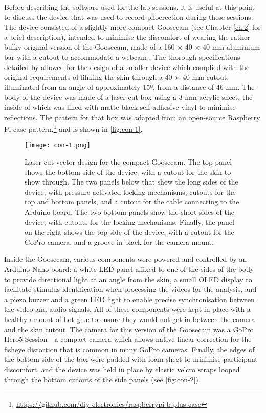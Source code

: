 Before describing the software used for the lab sessions, it is useful at this point to discuss the device that was used to record piloerection during these sessions. The device consisted of a slightly more compact Goosecam (see Chapter \ref{ch:2} for a brief description), intended to minimise the discomfort of wearing the rather bulky original version of the Goosecam, made of a 160 $\times$ 40 $\times$ 40 mm aluminium bar with a cutout to accommodate a webcam \parencite{benedek2010}. The thorough specifications detailed by \textcite{benedek2010} allowed for the design of a smaller device which complied with the original requirements of filming the skin through a 40 $\times$ 40 mm cutout, illuminated from an angle of approximately 15º, from a distance of 46 mm. The body of the device was made of a laser-cut box using a 3 mm acrylic sheet, the inside of which was lined with matte black self-adhesive vinyl to minimise reflections. The pattern for that box was adapted from an open-source Raspberry Pi case pattern,\footnote{\url{https://github.com/diy-electronics/raspberrypi-b-plus-case}} and is shown in \autoref{fig:con-1}.

\begin{figure}[t!]
\texttt{[image: con-1.png]}
\centering
\caption{Laser-cut vector design for the compact Goosecam. The top panel shows the bottom side of the device, with a cutout for the skin to show through. The two panels below that show the long sides of the device, with pressure-activated locking mechanisms, cutouts for the top and bottom panels, and a cutout for the cable connecting to the Arduino board. The two bottom panels show the short sides of the device, with cutouts for the locking mechanisms. Finally, the panel on the right shows the top side of the device, with a cutout for the GoPro camera, and a groove in black for the camera mount.}
\label{fig:con-1}
\end{figure}

Inside the Goosecam, various components were powered and controlled by an Arduino Nano board: a white LED panel affixed to one of the sides of the body to provide directional light at an angle from the skin, a small OLED display to facilitate stimulus identification when processing the videos for the analysis, and a piezo buzzer and a green LED light to enable precise synchronisation between the video and audio signals. All of these components were kept in place with a healthy amount of hot glue to ensure they would not get in between the camera and the skin cutout. The camera for this version of the Goosecam was a GoPro Hero5 Session---a compact camera which allows native linear correction for the fisheye distortion that is common in many GoPro cameras. Finally, the edges of the bottom side of the box were padded with foam sheet to minimise participant discomfort, and the device was held in place by elastic velcro straps looped through the bottom cutouts of the side panels (see \autoref{fig:con-2}).

